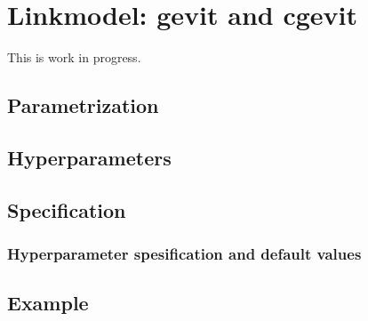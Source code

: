 \documentclass[a4paper,11pt]{article}
\begin{document}
\section*{Linkmodel: gevit and cgevit}

This is work in progress.

\subsection*{Parametrization}


\subsection*{Hyperparameters}


\subsection*{Specification}

\subsubsection*{Hyperparameter spesification and default values}



\subsection*{Example}

\end{document}
